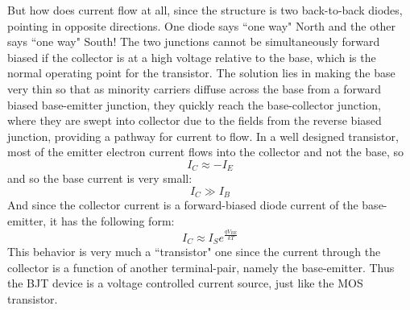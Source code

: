 But how does current flow at all, since the structure is two back-to-back diodes, pointing in opposite directions.  One diode says ``one way" North and the other says ``one way" South!  The two junctions cannot be simultaneously forward biased if the collector is at a high voltage relative to the base, which is the normal operating point for the transistor.  The solution lies in making the base very thin so that as minority carriers diffuse across the base from a forward biased base-emitter junction, they quickly reach the base-collector junction, where they are swept into collector due to the fields from the reverse biased junction, providing a pathway for current to flow.  
In a well designed transistor, most of the emitter electron current flows into the collector and not the base, so 
    \begin{equation}
        {I_C} \approx  - {I_E}
    \end{equation}
and so the base current is very small:
    \begin{equation}
        {I_C} \gg {I_B}
    \end{equation}
And since the collector current is a forward-biased diode current of the base-emitter, it has the following form:
    \begin{equation}
        {I_C} \approx {I_S}{e^{\frac{{q{V_{BE}}}}{{kT}}}}
    \end{equation}
This behavior is very much a ``transistor" one since the current through the collector is a function of another terminal-pair, namely the base-emitter.  Thus the BJT device is a voltage controlled current source, just like the MOS transistor.
